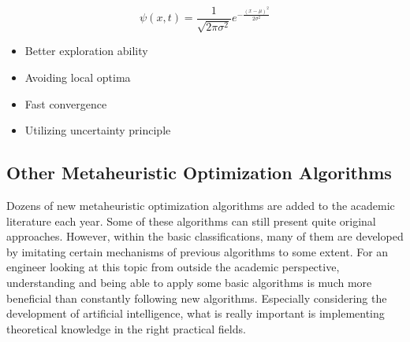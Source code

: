 \begin{equation}
\psi(x,t) = \frac{1}{\sqrt{2\pi\sigma^2}} e^{-\frac{(x-\mu)^2}{2\sigma^2}}
\end{equation}

\begin{tcolorbox}[title=Advantages of Quantum Mechanism]
\begin{itemize}
    \item Better exploration ability
    \item Avoiding local optima
    \item Fast convergence
    \item Utilizing uncertainty principle
\end{itemize}
\end{tcolorbox}

\subsection{Other Metaheuristic Optimization Algorithms}
Dozens of new metaheuristic optimization algorithms are added to the academic literature each year. Some of these algorithms can still present quite original approaches. However, within the basic classifications, many of them are developed by imitating certain mechanisms of previous algorithms to some extent. For an engineer looking at this topic from outside the academic perspective, understanding and being able to apply some basic algorithms is much more beneficial than constantly following new algorithms. Especially considering the development of artificial intelligence, what is really important is implementing theoretical knowledge in the right practical fields. 